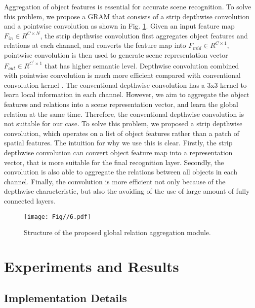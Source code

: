 \documentclass[letterpaper, 10 pt, conference]{ieeeconf}  %
\begin{document}
Aggregation of object features is essential for accurate scene recognition. To solve this problem, we propose a GRAM that consists of a strip depthwise convolution and a pointwise convolution as shown in Fig. \ref{img6}. Given an input feature map $F_{in}\in{R^{C\times N}}$, the strip depthwise convolution first aggregates object features and relations at each channel, and converts the feature map into $F_{mid}\in{R^{C\times 1}}$, pointwise convolution is then used to generate scene representation vector $F_{out}\in{R^{C^{'}\times 1}}$ that has higher semantic level. Depthwise convolution combined with pointwise convolution is much more efficient compared with conventional convolution kernel \cite{Francois2017}. The conventional depthwise convolution has a 3x3 kernel to learn local information in each channel. However, we aim to aggregate the object features and relations into a scene representation vector, and learn the global relation at the same time. Therefore, the conventional depthwise convolution is not suitable for our case. To solve this problem, we proposed a strip depthwise convolution, which operates on a list of object features rather than a patch of spatial features. The intuition for why we use this is clear. Firstly, the strip depthwise convolution can convert object feature map into a representation vector, that is more suitable for the final recognition layer. Secondly, the convolution is also able to aggregate the relations between all objects in each channel. Finally, the convolution is more efficient not only because of the depthwise characteristic, but also the avoiding of the use of large amount of fully connected layers.

\begin{figure}[]
        \centering
        \texttt{[image: Fig//6.pdf]}
        \vspace{-1mm}
        \caption{Structure of the proposed global relation aggregation module.}
        \label{img6}
        \vspace{-4mm}
\end{figure}

\section{Experiments and Results}
\label{Experiments and Results}

\subsection{Implementation Details}
\label{Implementation Details}
\end{document}
